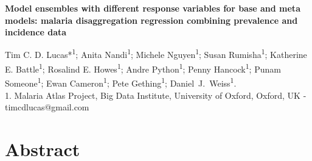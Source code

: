 \documentclass[11pt]{article}
\begin{document}



\small{

\begin{center}
\textbf{Model ensembles with different response variables for base and meta models: malaria disaggregation regression combining prevalence and incidence data}
\end{center}



\begin{center}
{Tim C. D. Lucas*\textsuperscript{1}; Anita Nandi\textsuperscript{1}; Michele Nguyen\textsuperscript{1}; 
Susan Rumisha\textsuperscript{1}; 
Katherine E. Battle\textsuperscript{1}; Rosalind E. Howes\textsuperscript{1}; Andre Python\textsuperscript{1}; Penny Hancock\textsuperscript{1}; Punam Someone\textsuperscript{1};
Ewan Cameron\textsuperscript{1}; Pete Gething\textsuperscript{1}; Daniel~J.~Weiss\textsuperscript{1}.}\\
{1. Malaria Atlas Project, Big Data Institute, University of Oxford, Oxford, UK - timcdlucas@gmail.com}\\ 


\end{center}
\section{Abstract}




}
\end{document}
